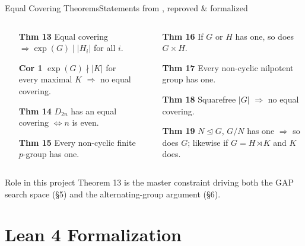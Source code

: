\documentclass[9pt,aspectratio=169]{beamer}
\begin{document}
\begin{frame}{Equal Covering Theorems}{Statements from \cite{vb}, reproved \& formalized}
\begin{columns}[T]
\begin{column}{0.5\textwidth}
\begin{itemize}
\item[\textbf{Thm 13}] Equal covering $\Rightarrow \exp(G)\mid |H_i|$ for all $i$.
\item[\textbf{Cor 1}] $\exp(G)\nmid |K|$ for every maximal $K$ $\Rightarrow$ no equal covering.
\item[\textbf{Thm 14}] $D_{2n}$ has an equal covering $\iff n$ is even.
\item[\textbf{Thm 15}] Every non-cyclic finite $p$-group has one.
\end{itemize}
\end{column}
\begin{column}{0.5\textwidth}
\begin{itemize}
\item[\textbf{Thm 16}] If $G$ or $H$ has one, so does $G\times H$.
\item[\textbf{Thm 17}] Every non-cyclic nilpotent group has one.
\item[\textbf{Thm 18}] Squarefree $|G|$ $\Rightarrow$ no equal covering.
\item[\textbf{Thm 19}] $N\trianglelefteq G$, $G/N$ has one $\Rightarrow$ so does $G$; likewise if $G=H\rtimes K$ and $K$ does.
\end{itemize}
\end{column}
\end{columns}
\vspace{6pt}
\begin{block}{Role in this project}
Theorem 13 is the master constraint driving both the GAP search space (\S5) and the alternating-group argument (\S6).
\end{block}
\end{frame}

\section{Lean 4 Formalization}
\end{document}
